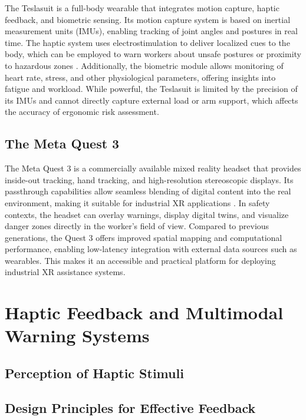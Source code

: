 The Teslasuit is a full-body wearable that integrates motion capture, haptic feedback,
and biometric sensing. Its motion capture system is based on inertial measurement
units (IMUs), enabling tracking of joint angles and postures in real time. The haptic
system uses electrostimulation to deliver localized cues to
the body, which can be employed to warn workers about unsafe postures or proximity
to hazardous zones \cite{teslasuitwhitepaper}. Additionally, the biometric module allows
monitoring of heart rate, stress, and other physiological parameters, offering insights
into fatigue and workload. While powerful, the Teslasuit is limited by the precision of
its IMUs and cannot directly capture external load or arm support, which affects the
accuracy of ergonomic risk assessment.

\subsection{The Meta Quest 3}

The Meta Quest 3 is a commercially available mixed reality headset that provides
inside-out tracking, hand tracking, and high-resolution stereoscopic displays.
Its passthrough capabilities allow seamless blending of digital content into the
real environment, making it suitable for industrial XR applications \cite{metaquest2023}. 
In safety contexts, the headset can overlay warnings, display digital twins, and 
visualize danger zones directly in the worker’s field of view. Compared to previous 
generations, the Quest 3 offers improved spatial mapping and computational 
performance, enabling low-latency integration with external data sources such 
as wearables. This makes it an accessible and practical platform for deploying 
industrial XR assistance systems.

\section{Haptic Feedback and Multimodal Warning Systems}
\subsection{Perception of Haptic Stimuli}

\subsection{Design Principles for Effective Feedback}

